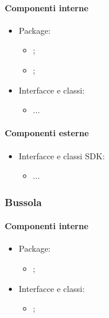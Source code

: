 \documentclass[../Funzionalita.tex]{subfiles}
\begin{document}
			\paragraph*{Componenti interne}
			\begin{itemize}
			
				\item Package:
				\begin{itemize}
					\item[] \navigator;
					\item[] \algorithm;
				\end{itemize}
				
				\item Interfacce e classi:
				\begin{itemize}
					\item[] ...
				\end{itemize}
				
			\end{itemize}
			
			
			\paragraph*{Componenti esterne}
			
			\begin{itemize}
				\item Interfacce e classi SDK:
				\begin{itemize}
					\item[] ...
				\end{itemize}
			\end{itemize}
		
		
		\subsubsection{Bussola}
		
			\paragraph*{Componenti interne}
			\begin{itemize}
			
				\item Package:
				\begin{itemize}
					\item[] \compass;
				\end{itemize}
				
				\item Interfacce e classi:
				\begin{itemize}
					\item[] \Compass;
				\end{itemize}
				
			\end{itemize}
			
\end{document}

